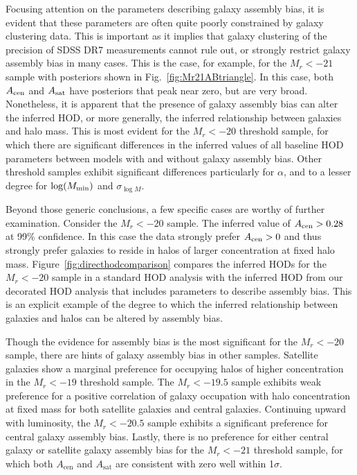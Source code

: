 \documentclass[usenatbib,usegraphicx,letterpaper]{mn2e}
\begin{document}
Focusing attention on the parameters describing galaxy assembly bias, it is
evident that these parameters are often quite poorly constrained by galaxy
clustering data. This is important as it implies that galaxy clustering of the precision
of SDSS DR7 measurements cannot rule out, or strongly restrict galaxy assembly
bias in many cases. This is the case, for example, for the $M_r<-21$ sample with posteriors
shown in Fig.~\ref{fig:Mr21ABtriangle}. In this case, both $A_{\rm cen}$ and
$A_{\rm sat}$ have posteriors that peak near zero, but are very broad.
Nonetheless, it is apparent that the presence of galaxy assembly bias
can alter the inferred HOD, or more generally, the inferred relationship between
galaxies and halo mass. This is most evident for the $M_r < -20$ threshold sample,
for which there are significant differences in the inferred values of all baseline HOD
parameters between models with and without galaxy assembly bias. Other threshold
samples exhibit significant differences particularly for $\alpha$, and to a lesser degree
for $\log (M_{\rm min})$ and $\sigma_{\log M}$.


Beyond those generic conclusions, a few specific cases are worthy of further examination.
Consider the $M_r < -20$ sample. The inferred value of $A_{\rm cen} > 0.28$ at 99\%
confidence. In this case the data strongly prefer $A_{\rm cen} > 0$ and thus strongly prefer
galaxies to reside in halos of larger concentration at fixed halo mass. Figure~\ref{fig:directhodcomparison}
compares the inferred HODs for the $M_r<-20$ sample in a standard HOD analysis with the
inferred HOD from our decorated HOD analysis that includes parameters to describe
assembly bias. This is an explicit example of the degree to which the inferred relationship
between galaxies and halos can be altered by assembly bias.


Though the evidence for assembly bias is the most significant for the $M_r<-20$ sample,
there are hints of galaxy assembly bias in other samples. Satellite galaxies show a marginal preference
for occupying halos of higher concentration in the $M_r < -19$ threshold sample. The $M_r < -19.5$
sample exhibits weak preference for a positive correlation of galaxy occupation with halo concentration at fixed
mass for both satellite galaxies and central galaxies. Continuing upward with luminosity,
the $M_r < -20.5$ sample exhibits a significant preference for central galaxy assembly bias.
Lastly, there is no preference for either central galaxy or satellite galaxy assembly bias
for the $M_r < -21$ threshold sample, for which both $A_{\mathrm{cen}}$ and $A_{\mathrm{sat}}$
are consistent with zero well within 1$\sigma$.
\end{document}
